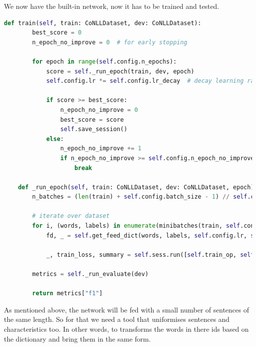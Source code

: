 We now have the built-in network, now it has to be trained and tested.

\begin{lstlisting}[language=Python,caption={Train network}]
    def train(self, train: CoNLLDataset, dev: CoNLLDataset):
        best_score = 0
        n_epoch_no_improve = 0  # for early stopping
    
        for epoch in range(self.config.n_epochs):
            score = self._run_epoch(train, dev, epoch)
            self.config.lr *= self.config.lr_decay  # decay learning rate
    
            if score >= best_score:
                n_epoch_no_improve = 0
                best_score = score
                self.save_session()
            else:
                n_epoch_no_improve += 1
                if n_epoch_no_improve >= self.config.n_epoch_no_improve:
                    break
    
    def _run_epoch(self, train: CoNLLDataset, dev: CoNLLDataset, epoch) -> int:
        n_batches = (len(train) + self.config.batch_size - 1) // self.config.batch_size

        # iterate over dataset
        for i, (words, labels) in enumerate(minibatches(train, self.config.batch_size)):
            fd, _ = self.get_feed_dict(words, labels, self.config.lr, self.config.dropout)

            _, train_loss, summary = self.sess.run([self.train_op, self.loss, self.merged], feed_dict=fd)

        metrics = self._run_evaluate(dev)

        return metrics["f1"]
\end{lstlisting}

As mentioned above, the network will be fed with a small number of sentences of the same length. So for that we need a tool that uniformises sentences and characteristics too. In other words, to transforms the words in there ids based on the dictionary and bring them in the same form.

